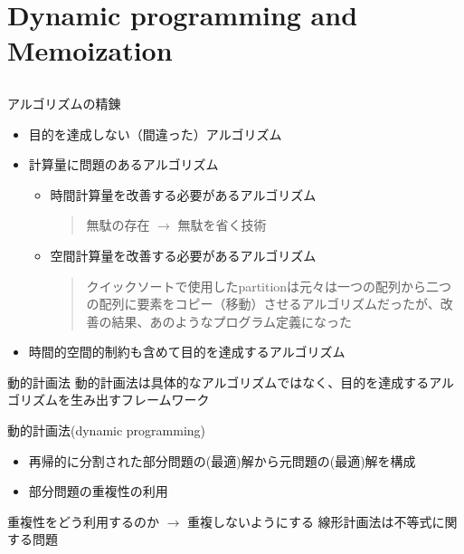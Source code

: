 \documentclass{beamer}
\subtitle{動的計画法}
\begin{document}
\begin{frame}[fragile]{}
\titlepage
\end{frame}

\section{Dynamic programming and Memoization}		%
\subsection{}

\begin{frame}[fragile]{アルゴリズムの精錬}{}
\begin{itemize}\itemsep10pt
\item 目的を達成しない（間違った）アルゴリズム
\item 計算量に問題のあるアルゴリズム
\begin{itemize}\itemsep8pt
\item 時間計算量を改善する必要があるアルゴリズム
\begin{quote}
無駄の存在 $\to$ 無駄を省く技術
\end{quote}
\item 空間計算量を改善する必要があるアルゴリズム
\begin{quote}
クイックソートで使用したpartitionは元々は一つの配列から二つの配列に要素をコピー（移動）させるアルゴリズムだったが、改善の結果、あのようなプログラム定義になった
\end{quote}
\end{itemize}
\item 時間的空間的制約も含めて目的を達成するアルゴリズム
\end{itemize}
\end{frame}

\begin{frame}[fragile]{動的計画法}{}
動的計画法は具体的なアルゴリズムではなく、目的を達成するアルゴリズムを生み出すフレームワーク
\vfill
\begin{block}{動的計画法(dynamic programming)}
\begin{itemize}%
\item 再帰的に分割された部分問題の(最適)解から元問題の(最適)解を構成
\item 部分問題の重複性の利用
\end{itemize}
\end{block}
\vfill
重複性をどう利用するのか $\to$ 重複しないようにする
\vfill
{\fontsize{8}{9}\selectfont 線形計画法は不等式に関する問題}
\end{frame}
\end{document}
